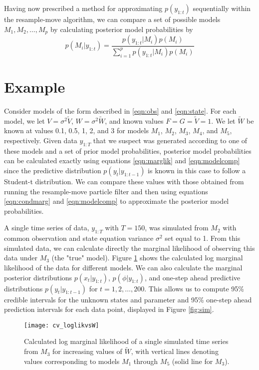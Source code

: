 \documentclass{article}
\begin{document}
Having now prescribed a method for approximating $p(y_{1:t})$ sequentially within the resample-move algorithm, we can compare a set of possible models ${M_1,M_2,\ldots,M_p}$ by calculating posterior model probabilities by
\begin{equation}
p(M_i|y_{1:t}) = \frac{p(y_{1:t}|M_i)p(M_i)}{\sum_{i=1}^p p(y_{1:t}|M_i)p(M_i)} \label{eqn:modelcomp}
\end{equation}

\section{Example}

Consider models of the form described in \eqref{eqn:obs} and \eqref{eqn:state}. For each model, we let $V = \sigma^2\tilde{V}$, $W = \sigma^2\tilde{W}$, and known values $F = G = \tilde{V} = 1$. We let $\tilde{W}$ be known at values 0.1, 0.5, 1, 2, and 3 for models $M_1$, $M_2$, $M_3$, $M_4$, and $M_5$, respectively. Given data $y_{1:T}$ that we suspect was generated according to one of these models and a set of prior model probabilities, posterior model probabilities can be calculated exactly using equations \eqref{eqn:marglik} and \eqref{eqn:modelcomp} since the predictive distribution $p(y_t|y_{1:t-1})$ is known in this case to follow a Student-t distribution. We can compare these values with those obtained from running the resample-move particle filter and then using equations \eqref{eqn:condmarg} and \eqref{eqn:modelcomp} to approximate the posterior model probabilities.

A single time series of data, $y_{1:T}$ with $T = 150$, was simulated from $M_2$ with common observation and state equation variance $\sigma^2$ set equal to 1. From this simulated data, we can calculate directly the marginal likelihood of observing this data under $M_3$ (the "true" model). Figure \ref{fig:loglikvW} shows the calculated log marginal likelihood of the data for different models. We can also calculate the marginal posterior distributions $p(x_t|y_{1:t})$, $p(\phi|y_{1:t})$, and one-step ahead predictive distributions $p(y_t|y_{1:t-1})$ for $t = 1,2,\ldots,200$. This allows us to compute 95\% credible intervals for the unknown states and parameter and 95\% one-step ahead prediction intervals for each data point, displayed in Figure \ref{fig:sim}.

\begin{figure}
\texttt{[image: cv\_loglikvsW]}
\caption{Calculated log marginal likelihood of a single simulated time series from $M_3$ for increasing values of $\tilde{W}$, with vertical lines denoting values corresponding to models $M_1$ through $M_5$ (solid line for $M_3$).} \label{fig:loglikvW}
\end{figure}
\end{document}
